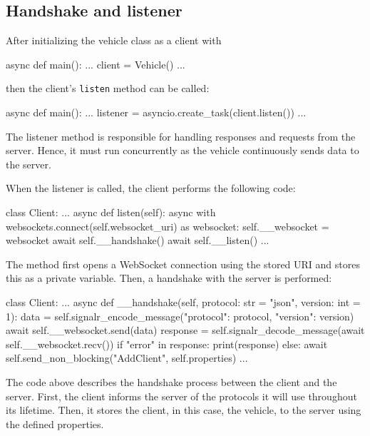 \subsection{Handshake and listener}\label{handshake}
After initializing the vehicle class as a client with
\begin{python}
async def main():
	...
	client = Vehicle()
	...
\end{python}
then the client's \verb|listen| method can be called:
\begin{python}
async def main():
	...
	listener = asyncio.create_task(client.listen())
	...
\end{python}
The listener method is responsible for handling responses and requests from the server. Hence, it must run concurrently as the vehicle continuously sends data to the server.

When the listener is called, the client performs the following code:
\begin{python}
class Client:
...
	async def listen(self):
	async with websockets.connect(self.websocket_uri) as websocket:
		self.__websocket = websocket
		await self.__handshake()
		await self.__listen()
...
\end{python}
The method first opens a WebSocket connection using the stored URI and stores this as a private variable. Then, a handshake with the server is performed:
\begin{python}
class Client:
...
	async def __handshake(self, protocol: str = "json", version: int = 1):
		data = self.signalr_encode_message({"protocol": protocol, "version": version})
		await self.__websocket.send(data)
		response = self.signalr_decode_message(await self.__websocket.recv())
		if "error" in response:
			print(response)
		else:
			await self.send_non_blocking("AddClient", self.properties)
...
\end{python}

The code above describes the handshake process between the client and the server. First, the client informs the server of the protocols it will use throughout its lifetime. Then, it stores the client, in this case, the vehicle, to the server using the defined properties.


